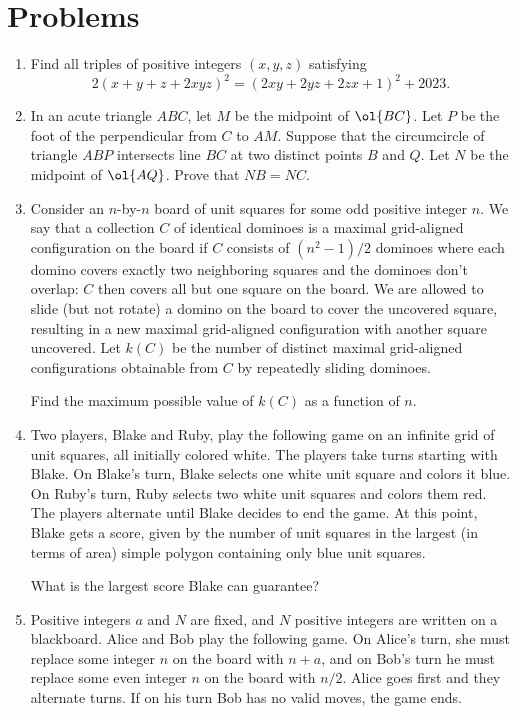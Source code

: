 \documentclass[11pt]{scrartcl}
\begin{document}
\section{Problems}
\begin{enumerate}[\bfseries 1.]
\item %
Find all triples of positive integers $(x,y,z)$ satisfying
\[ 2(x+y+z+2xyz)^2 = (2xy+2yz+2zx+1)^2 + 2023. \]

\item %
In an acute triangle $ABC$, let $M$ be the midpoint of $\ol{BC}$.
Let $P$ be the foot of the perpendicular from $C$ to $AM$.
Suppose that the circumcircle of triangle $ABP$
intersects line $BC$ at two distinct points $B$ and $Q$.
Let $N$ be the midpoint of $\ol{AQ}$.
Prove that $NB = NC$.

\item %
Consider an $n$-by-$n$ board of unit squares for some odd positive integer $n$.
We say that a collection $C$ of identical dominoes is a
maximal grid-aligned configuration on the board if $C$ consists of $(n^2-1)/2$
dominoes where each domino covers exactly two neighboring squares
and the dominoes don't overlap: $C$ then covers all but one square on the board.
We are allowed to slide (but not rotate) a domino on the board to
cover the uncovered square, resulting in a new maximal grid-aligned configuration
with another square uncovered. Let $k(C)$ be the number of distinct maximal
grid-aligned configurations obtainable from $C$ by repeatedly sliding dominoes.

Find the maximum possible value of $k(C)$ as a function of $n$.

\item %
Two players, Blake and Ruby, play the following game
on an infinite grid of unit squares, all initially colored white.
The players take turns starting with Blake.
On Blake's turn, Blake selects one white unit square and colors it blue.
On Ruby's turn, Ruby selects two white unit squares and colors them red.
The players alternate until Blake decides to end the game.
At this point, Blake gets a score, given by the number of unit squares in the
largest (in terms of area) simple polygon containing only blue unit squares.

What is the largest score Blake can guarantee?

\item %
Positive integers $a$ and $N$ are fixed,
and $N$ positive integers are written on a blackboard.
Alice and Bob play the following game.
On Alice's turn, she must replace some integer $n$ on the board with $n+a$,
and on Bob's turn he must replace some even integer $n$ on the board with $n/2$.
Alice goes first and they alternate turns.
If on his turn Bob has no valid moves, the game ends.


\end{enumerate}
\end{document}
